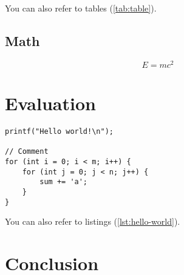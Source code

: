 \documentclass[
	12pt,
	a4paper,
	bibliography=totoc,
	numbers=endperiod,
	parskip=half,
]{scrartcl}
\begin{document}
You can also refer to tables (\cref{tab:table}).

\subsection{Math}

\[
	E = m c^2
\]

\section{Evaluation}
\label{sec:evaluation}

\begin{lstlisting}[caption=Caption,label=lst:hello-world]
printf("Hello world!\n");

// Comment
for (int i = 0; i < m; i++) {
	for (int j = 0; j < n; j++) {
		sum += 'a';
	}
}
\end{lstlisting}

You can also refer to listings (\cref{lst:hello-world}).

\section{Conclusion}
\label{sec:conclusion}


\lipsum[1-3]

\newpage



\end{document}
